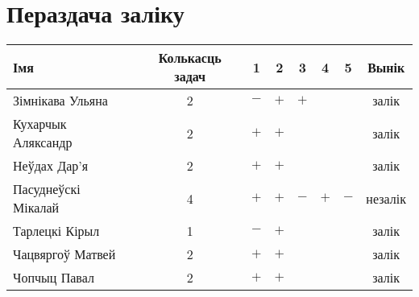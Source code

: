 \documentclass[12pt, a4paper]{extarticle}
\begin{document}
    \section{Пераздача заліку}
    \begin{table}[H]
        \begin{tabular}{|l|c|c|c|c|c|c|c|}
            \hline
            Імя                 & Колькасць задач &  1  &  2  &  3  &  4  &  5  &  Вынік  \\ \hline
            Зімнікава Ульяна    &        2        & $-$ & $+$ & $+$ &     &     &  залік  \\ \hline
            Кухарчык Аляксандр  &        2        & $+$ & $+$ &     &     &     &  залік  \\ \hline
            Неўдах Дар'я        &        2        & $+$ & $+$ &     &     &     &  залік  \\ \hline
            Пасуднеўскі Мікалай &        4        & $+$ & $+$ & $-$ & $+$ & $-$ & незалік \\ \hline
            Тарлецкі Кірыл      &        1        & $-$ & $+$ &     &     &     &  залік  \\ \hline
            Чацвяргоў Матвей    &        2        & $+$ & $+$ &     &     &     &  залік  \\ \hline
            Чопчыц Павал        &        2        & $+$ & $+$ &     &     &     &  залік  \\ \hline
        \end{tabular}
    \end{table}
\end{document}
